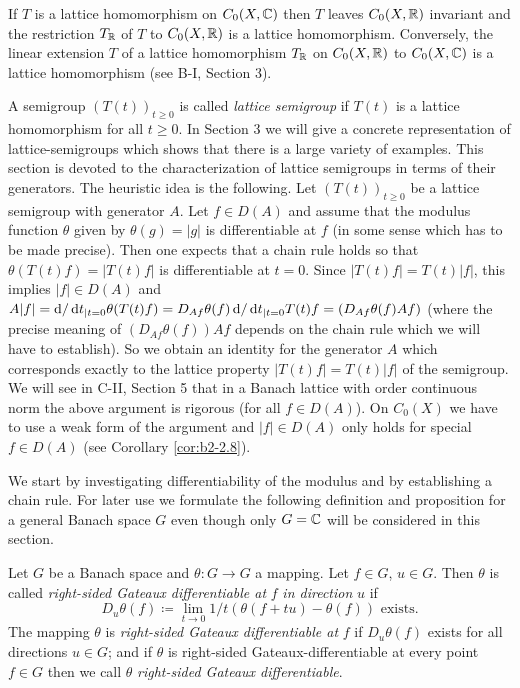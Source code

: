 \begin{remark}\label{rem:b2-2.1}
If $T$ is a lattice homomorphism on $C_{0}(X,\mathbb{C})$ then $T$ leaves $C_{0}(X,\mathbb{R})$ invariant and the restriction $T_{\mathbb{R}}$ of $T$ to $C_{0}(X,\mathbb{R})$ is a lattice homomorphism.
Conversely, the linear extension $T$ of a lattice homomorphism $T_{\mathbb{R}}$ on $C_{0}(X,\mathbb{R})$ to $C_{0}(X,\mathbb{C})$ is a lattice homomorphism (see B-I, Section 3).
\end{remark}

A semigroup $(T(t))_{t \geq 0}$ is called \emph{lattice semigroup} if $T(t)$ is a lattice homomorphism for all $t \geq 0$.
In Section 3 we will give a concrete representation of lattice-semigroups which shows that there is a large variety of examples.
This section is devoted to the characterization of lattice semigroups in terms of their generators.
The heuristic idea is the following.
Let $(T(t))_{t \geq 0}$ be a lattice semigroup with generator $A$.
Let $f \in D(A)$ and assume that the modulus function $\theta$ given by $\theta(g) = |g|$ is differentiable at $f$ (in some sense which has to be made precise).
Then one expects that a chain rule holds so that $\theta(T(t)f) = |T(t)f|$ is differentiable at $t = 0$.
Since $|T(t)f| = T(t)|f|$, this implies $|f| \in D(A)$ and $A|f| = \mathop{}\!\mathrm{d}{}/\mathop{}\!\mathrm{d}{t}_{|t=0} \theta(T(t)f) = D_{Af}\theta(f)\mathop{}\!\mathrm{d}{/}\mathop{}\!\mathrm{d}{t}_{|t=0}T(t)f = (D_{Af}\theta(f)Af)$ (where the precise meaning of $(D_{Af}\theta(f))Af$ depends on the chain rule which we will have to establish).
So we obtain an identity for the generator $A$ which corresponds exactly to the lattice property $|T(t)f| = T(t)|f|$ of the semigroup.
We will see in C-II, Section  5 that in a Banach lattice with order continuous norm the above argument is rigorous (for all $f \in D(A)$).
On $C_{0}(X)$ we have to use a weak form of the argument and $|f| \in D(A)$ only holds for special $f \in D(A)$ (see Corollary  \ref{cor:b2-2.8}).

We start by investigating differentiability of the modulus and by establishing a chain rule.
For later use we formulate the following definition and proposition for a general Banach space $G$ even though only $G = \mathbb{C}$ will be considered in this section.

\begin{definition}\label{def:b2-2.2}
Let $G$ be a Banach space and $\theta \colon G \to G$ a mapping.
Let $f \in G$, $u \in G$.
Then $\theta$ is called \emph{right-sided Gateaux differentiable at} $f$ \emph{in direction} $u$ if
\begin{equation}\label{eq:b2-2.3}
D_{u}\theta(f) \coloneqq \lim_{t \to 0} 1/t(\theta(f+tu) - \theta(f)) \text{ exists.}
\end{equation}
The mapping $\theta$ is \emph{right-sided Gateaux differentiable at} $f$ if $D_{u}\theta(f)$ exists for all directions $u \in G$; and if $\theta$ is right-sided Gateaux-differentiable at every point $f \in G$ then we call $\theta$ \emph{right-sided Gateaux differentiable}.
\end{definition}

